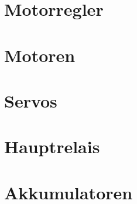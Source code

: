 \section{Motorregler}
\section{Motoren}
\section{Servos}
\section{Hauptrelais}
\section{Akkumulatoren}
